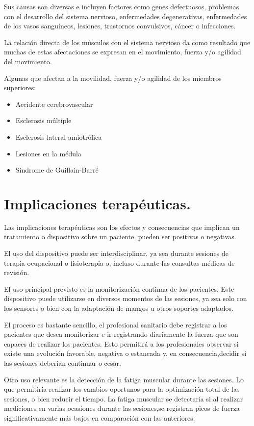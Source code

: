 Sus causas son diversas e incluyen factores como genes defectuosos, problemas con el desarrollo del sistema nervioso, enfermedades degenerativas, enfermedades de los vasos sanguíneos, lesiones, trastornos convulsivos, cáncer o infecciones. \cite{}

La relación directa de los músculos con el sistema nervioso da como resultado que muchas de estas afectaciones se expresan en el movimiento, fuerza y/o agilidad del movimiento. 

Algunas que afectan a la movilidad, fuerza y/o agilidad de los miembros superiores: 
\begin{itemize}
    \item Accidente cerebrovascular
    \item Esclerosis múltiple
    \item Esclerosis lateral amiotrófica
    \item Lesiones en la médula
    \item Síndrome de Guillain-Barré
\end{itemize}

\section{Implicaciones terapéuticas.}
Las implicaciones terapéuticas son los efectos y consecuencias que implican un tratamiento o dispositivo sobre un paciente, pueden ser positivas o negativas.

El uso del dispositivo puede ser interdisciplinar, ya sea durante sesiones de terapia ocupacional o fisioterapia o, incluso durante las consultas médicas de revisión. 

El uso principal previsto es la monitorización continua de los pacientes. Este dispositivo puede utilizarse en diversos momentos de las sesiones, ya sea solo con los sensores o bien con la adaptación de mangos u otros soportes adaptados.

El proceso es bastante sencillo, el profesional sanitario debe registrar a los pacientes que desea monitorizar e ir registrando diariamente la fuerza que son capaces de realizar los pacientes. Esto permitirá a los profesionales observar si existe una evolución favorable, negativa o estancada y, en consecuencia,decidir si las sesiones deberían continuar o cesar. 

Otro uso relevante es la detección de la fatiga muscular durante las sesiones. Lo que permitiría realizar los cambios oportunos para la optimización total de las sesiones, o bien reducir el tiempo. La fatiga muscular se detectaría si al realizar mediciones en varias ocasiones durante las sesiones,se registran picos de fuerza significativamente más bajos en comparación con las anteriores.

